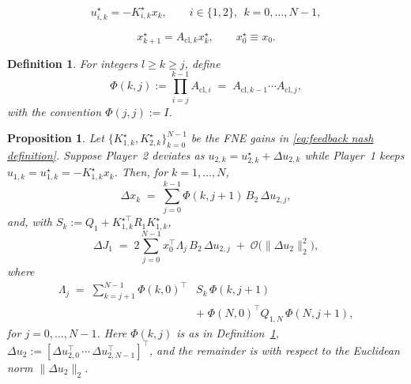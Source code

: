 \documentclass[10pt,a4paper]{amsart}
\newtheorem{definition}{Definition}
\newtheorem{proposition}{Proposition}
\begin{document}
\begin{equation}
\label{eq:feedback nash definition}
u^\star_{i,k} = -K^\star_{i,k} x_k, \qquad i\in\{1,2\},\ \ k=0,\dots,N-1,
\end{equation}

\begin{equation}
\label{eq:closed-loop Nash dynamic}
x_{k+1}^\star = A_{\mathrm{cl},k} x_k^\star,\qquad x_0^\star \equiv x_0.
\end{equation}

\begin{definition}
\label{def:phi}
For integers $l\ge k\ge j$, define
\begin{equation*}
\Phi(k,j) := \prod_{i=j}^{k-1} A_{\text{cl},i} \;=\; A_{\text{cl},k-1} \cdots A_{\text{cl},j},
\end{equation*}
with the convention $\Phi(j,j):=I$. 
\end{definition}

\begin{proposition}\label{prop:first_order}
Let $\{K^\star_{1,k}, K^\star_{2,k}\}_{k=0}^{N-1}$ be the FNE gains in \eqref{eq:feedback nash definition}. Suppose Player~2 deviates as $u_{2,k}=u^\star_{2,k}+\Delta u_{2,k}$ while Player~1 keeps $u_{1,k}=u^\star_{1,k}=-K^\star_{1,k}x_k$. Then, for $k=1,\dots,N$,
\begin{equation}\label{eq:dx_formula}
\Delta x_k \;=\; \sum_{j=0}^{k-1} \Phi(k,j+1)\,B_2\,\Delta u_{2,j},
\end{equation}
and, with $S_k := Q_1 + K_{1,k}^{\star\top} R_1 K^\star_{1,k}$,
\begin{equation}\label{eq:DJ_linear}
\Delta J_1 \;=\; 2 \sum_{j=0}^{N-1} x_0^\top \Lambda_j \,B_2\,\Delta u_{2,j} \;+\; \mathcal{O}\!\big(\|\Delta u_2\|_2^2\big),
\end{equation}
where
\begin{equation}\label{eq:Lambda_j}
\begin{aligned}
    \Lambda_j \;=\; \sum_{k=j+1}^{N-1} \Phi(k,0)^\top &S_k \,\Phi(k,j+1) \\
    \;&+\; \Phi(N,0)^\top Q_{1,N}\,\Phi(N,j+1),
\end{aligned}
\end{equation}
for $j=0,\dots,N-1$.
Here $\Phi(k,j)$ is as in Definition~\ref{def:phi}, $\Delta u_2:=[\Delta u_{2,0}^\top\,\cdots\,\Delta u_{2,N-1}^\top]^\top$, and
the remainder is with respect to the Euclidean norm $\|\Delta u_2\|_2$.
\end{proposition}
\end{document}
